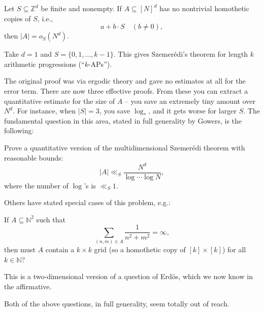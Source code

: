 \documentclass[reqno]{amsart} 
\numberwithin{theorem}{section}
\numberwithin{equation}{section}
\begin{document}
\begin{theorem}
  Let $S \subseteq \mathbb{Z}^d$ be finite and nonempty.  If $A \subseteq[N]^d$ has no nontrivial homothetic copies of $S$, i.e.,
  \begin{equation*}
    a + b \cdot S \quad(b \neq 0),
  \end{equation*}
  then $\lvert A \rvert = o_S(N^d)$.
\end{theorem}
\begin{example}
  Take $d = 1$ and $S = \{0, 1, \dotsc, k - 1\}$.  This gives Szemerédi's theorem for length $k$ arithmetic progressions (``$k$-APs'').
\end{example}
The original proof was via ergodic theory and gave no estimates at all for the error term.  There are now three effective proofs.  From these you can extract a quantitative estimate for the size of $A$ -- you save an extremely tiny amount over $N^d$.  For instance, when $\lvert S \rvert = 3$, you save $\log_\ast$, and it gets worse for larger $S$.  The fundamental question in this area, stated in full generality by Gowers, is the following:
\begin{problem}
  Prove a quantitative version of the multidimensional Szemerédi theorem with reasonable bounds:
  \begin{equation*}
    \lvert A \rvert \ll_S \frac{N^d}{\log \dotsb \log N},
  \end{equation*}
  where the number of $\log$'s is $\ll_S 1$.
\end{problem}
Others have stated special cases of this problem, e.g.:
\begin{question}[Graham, 1997]
  If $A \subseteq \mathbb{N}^2$ such that
  \begin{equation*}
    \sum_{(n, m) \in A} \frac{1}{ n^2 + m^2} = \infty,
  \end{equation*}
  then must $A$ contain a $k \times k$ grid (so a homothetic copy of $[k] \times[k]$) for all $k \in \mathbb{N}$?
\end{question}
This is a two-dimensional version of a question of Erdös, which we now know in the affirmative.

Both of the above questions, in full generality, seem totally out of reach.
\end{document}
